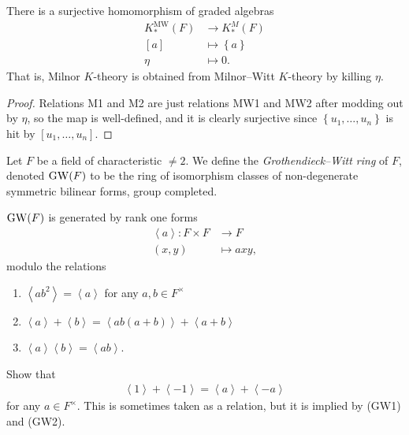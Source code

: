 \documentclass[11pt,openany]{book}
\providecommand{\MW}{\mathrm{MW}}
\begin{document}
\begin{proposition} There is a surjective homomorphism of graded algebras
\begin{align*}
    K_\ast^\MW(F) &\to K_\ast^M(F) \\
    [a] &\mapsto \left\{ a \right\} \\
    \eta &\mapsto 0.
\end{align*}
That is, Milnor $K$-theory is obtained from Milnor--Witt $K$-theory by killing $\eta$.
\end{proposition}
\begin{proof} Relations M1 and M2 are just relations MW1 and MW2 after modding out by $\eta$, so the map is well-defined, and it is clearly surjective since $\left\{ u_1, \ldots, u_n \right\}$ is hit by $ [u_1, \ldots, u_n]$.
\end{proof}


\begin{definition} Let $F$ be a field of characteristic $\ne 2$. We define the \textit{Grothendieck--Witt ring} of $F$, denoted $\mathrm{GW}(F)$ to be the ring of isomorphism classes of non-degenerate symmetric bilinear forms, group completed.
\end{definition}

\begin{proposition} $\mathrm{GW}(F)$ is generated by rank one forms
\begin{align*}
    \left\langle a \right\rangle \colon F \times F &\to F \\
    (x,y) &\mapsto axy,
\end{align*}
modulo the relations
\begin{enumerate}
    \item[(GW1)] $\left\langle ab^2 \right\rangle = \left\langle a \right\rangle$ for any $a,b\in F^\times$
     \item[(GW2)] $\left\langle a \right\rangle + \left\langle b \right\rangle = \left\langle ab(a+b) \right\rangle + \left\langle a+b \right\rangle$
     \item[(GW3)] $\left\langle a \right\rangle \left\langle b \right\rangle = \left\langle ab \right\rangle$.
\end{enumerate}
\end{proposition}

\begin{exercise} Show that
\begin{align*}
    \left\langle 1 \right\rangle + \left\langle -1 \right\rangle = \left\langle a \right\rangle + \left\langle -a \right\rangle
\end{align*}
for any $a\in F^\times$. This is sometimes taken as a relation, but it is implied by (GW1) and (GW2).
\end{exercise}
\end{document}
